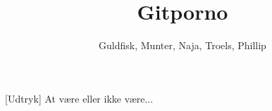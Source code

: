 \documentclass[a4paper,11pt]{article}
\title{Gitporno}
\author{Guldfisk, Munter, Naja, Troels, Phillip}
\begin{document}
\maketitle


\begin{sketch}


[Udtryk] At være eller ikke være... 



\end{sketch}
\end{document}
